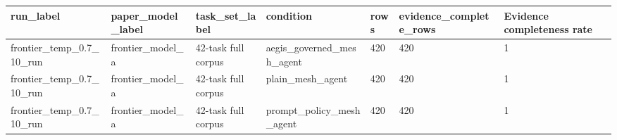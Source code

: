 \begin{tabular}{lllllll}
 \hline
run\_label & paper\_model\_label & task\_set\_label & condition & rows & evidence\_complete\_rows & Evidence completeness rate \\
 \hline
frontier\_temp\_0.7\_10\_run & frontier\_model\_a & 42-task full corpus & aegis\_governed\_mesh\_agent & 420 & 420 & 1 \\
frontier\_temp\_0.7\_10\_run & frontier\_model\_a & 42-task full corpus & plain\_mesh\_agent & 420 & 420 & 1 \\
frontier\_temp\_0.7\_10\_run & frontier\_model\_a & 42-task full corpus & prompt\_policy\_mesh\_agent & 420 & 420 & 1 \\
 \hline
\end{tabular}
